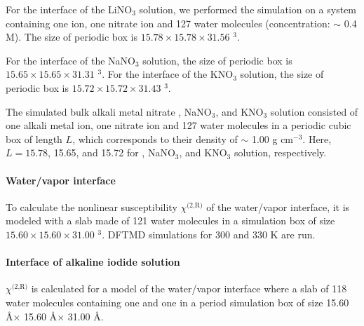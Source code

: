 For the interface of the LiNO$_3$ solution, we performed the simulation on a system containing one \Li ion, one nitrate ion 
and 127 water molecules (concentration: $\sim$ 0.4 M). 
The size of periodic box is $15.78 \times 15.78 \times 31.56$ \A$^3$.

For the interface of the NaNO$_3$ solution, the size of periodic box is $15.65 \times 15.65 \times 31.31$ \A$^3$. %
For the interface of the KNO$_3$ solution, the size of periodic box is $15.72 \times 15.72 \times 31.43$ \A$^3$. %

The simulated bulk alkali metal nitrate \LiN, NaNO$_3$, and KNO$_3$ solution consisted of one alkali metal ion, 
one nitrate ion and 127 water molecules in a periodic cubic box of length $L$, which corresponds to their density of $\sim$ 1.00 g cm$^{-3}$. 
Here, $L=15.78$, 15.65, and 15.72 for \LiN, NaNO$_3$, and KNO$_3$ solution, respectively.


\paragraph{Water/vapor interface}
To calculate the nonlinear susceptibility $\chi^\text{(2,R)}$ of the water/vapor interface, it is modeled with a slab 
made of 121 water molecules in a simulation box of size $15.60 \times 15.60 \times 31.00$ \A$^3$. 
DFTMD simulations for 300 and 330 K are run.

\paragraph{Interface of alkaline iodide solution}
$\chi^\text{(2,R)}$ is calculated for a model of the water/vapor interface where a slab of 118 
water molecules containing one \Li and one \I in a period simulation box of size 15.60 \AA $\times$ 15.60 \AA $\times$ 31.00 \AA.

